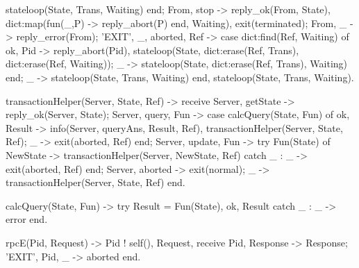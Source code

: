 \documentclass[11pt]{article}
\renewenvironment{verbatim}{}{}
\begin{document}
\begin{verbatim}
                    stateloop(State, Trans, Waiting)
            end;
        {From, stop} ->
            reply_ok(From, State),
            dict:map(fun(_,P) -> reply_abort(P) end, Waiting), %Abort all waiting processes
            exit(terminated); %Kill self and all (linked) subprocesses, that is all transaction processes
        {From, _} -> 
            reply_error(From);
        {'EXIT', _, {aborted, Ref}} -> %Subprocess has aborted. Tell waiting processes
            case dict:find(Ref, Waiting) of
                {ok, Pid} -> 
                    reply_abort(Pid),
                    stateloop(State, dict:erase(Ref, Trans), dict:erase(Ref, Waiting));
                _ -> stateloop(State, dict:erase(Ref, Trans), Waiting)
            end;
        _ -> %bad call, keep looping. Also catches normal exits of transactionHelpers
            stateloop(State, Trans, Waiting)
    end,
    stateloop(State, Trans, Waiting). %Needed because not all recieve-cases loops themselves

% Subprocesses for each transaction of stateloop. 
% Can only be manipulated by its parrent, the server.
transactionHelper(Server, State, Ref) -> 
    receive
        {Server, getState} -> 
            reply_ok(Server, State);
        {Server, query, Fun} ->
            case calcQuery(State, Fun) of
                {ok, Result} -> 
                    info(Server, {queryAns, Result, Ref}),
                    transactionHelper(Server, State, Ref);
                _ -> 
                    exit({aborted, Ref})
            end;
        {Server, update, Fun} ->
            try Fun(State) of 
                NewState -> 
                    transactionHelper(Server, NewState, Ref)
            catch
                _ : _ -> 
                    exit({aborted, Ref}) %Case of error, abort and tell server                    
            end;
        {Server, aborted} -> exit(normal); %No need for server to catch this as server aborted me
        _ -> transactionHelper(Server, State, Ref)
    end.
    

calcQuery(State, Fun) ->
    try 
        Result = Fun(State),
        {ok, Result}
    catch
        _ : _ -> error
    end.


%%%-------------------------------------------------------------------
%%% Communication primitives
%%%-------------------------------------------------------------------

%% synchronous communication
rpcE(Pid, Request) ->
    Pid ! {self(), Request},
    receive
        {Pid, Response} -> Response;
        {'EXIT', Pid, _} -> aborted
    end.


\end{verbatim}
\end{document}
